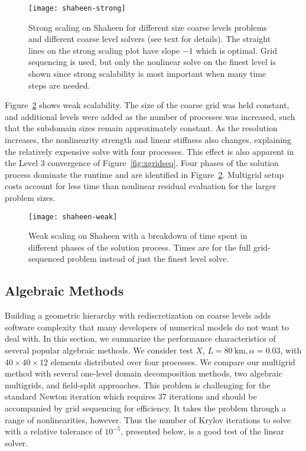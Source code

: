 \begin{figure}
  \centering\texttt{[image: shaheen-strong]}
  \caption{Strong scaling on Shaheen for different size coarse levels problems and different coarse level solvers (see text for details).
    The straight lines on the strong scaling plot have slope $-1$ which is optimal.
    Grid sequencing is used, but only the nonlinear solve on the finest level is shown since strong scalability is most important when many time steps are needed.}\label{fig:shaheen-strong}
\end{figure}

Figure~\ref{fig:shaheen-weak} shows weak scalability.
The size of the coarse grid was held constant, and additional levels were added as the number of processes was increased, such that the subdomain sizes remain approximately constant.
As the resolution increases, the nonlinearity strength and linear stiffness also changes, explaining the relatively expensive solve with four processes.
This effect is also apparent in the Level 3 convergence of Figure~\ref{fig:xgridseq}.
Four phases of the solution process dominate the runtime and are identified in Figure~\ref{fig:shaheen-weak}.
Multigrid setup costs account for less time than nonlinear residual evaluation for the larger problem sizes.

\begin{figure}
  \centering\texttt{[image: shaheen-weak]}
  \caption{Weak scaling on Shaheen with a breakdown of time spent in different phases of the solution process.
    Times are for the full grid-sequenced problem instead of just the finest level solve.}\label{fig:shaheen-weak}
\end{figure}

\subsection{Algebraic Methods}\label{sec:1level}
Building a geometric hierarchy with rediscretization on coarse levels adds software complexity that many developers of numerical models do not want to deal with.  In this section, we summarize the performance characteristics of several popular algebraic methods.  We consider test $X$, $L = \SI{80}{\kilo\metre}, \alpha=0.03$, with $40\times 40\times 12$ elements distributed over four processes. We compare our multigrid method with several one-level domain decomposition methods, two algebraic multigrids, and field-split approaches. This problem is challenging for the standard Newton iteration which requires 37 iterations and should be accompanied by grid sequencing for efficiency. It takes the problem through a range of nonlinearities, however. Thus the number of Krylov iterations to solve with a relative tolerance of $10^{-5}$, presented below, is a good test of the linear solver.

